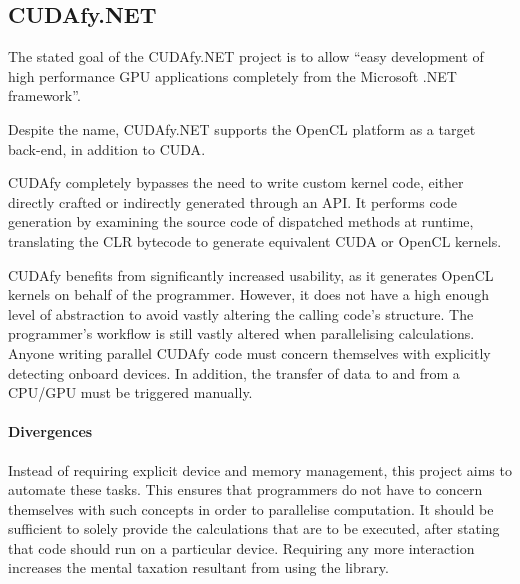 \subsection{CUDAfy.NET}
The stated goal of the CUDAfy.NET\cite{cudafy} project is to allow ``easy development of high performance \ac{GPU} applications completely from the Microsoft .NET framework''.

Despite the name, CUDAfy.NET supports the \ac{OpenCL} platform as a target back-end, in addition to \ac{CUDA}.

CUDAfy completely bypasses the need to write custom kernel code, either directly crafted or indirectly generated through an API. It performs code generation by examining the source code of dispatched methods at runtime, translating the \ac{CLR} bytecode to generate equivalent \ac{CUDA} or \ac{OpenCL} kernels.

CUDAfy benefits from significantly increased usability, as it generates \ac{OpenCL} kernels on behalf of the programmer. However, it does not have a high enough level of abstraction to avoid vastly altering the calling code's structure. The programmer's workflow is still vastly altered when parallelising calculations. Anyone writing parallel CUDAfy code must concern themselves with explicitly detecting onboard devices. In addition, the transfer of data to and from a \ac{CPU}/\ac{GPU} must be triggered manually.

\paragraph*{Divergences}
Instead of requiring explicit device and memory management, this project aims to automate these tasks. This ensures that programmers do not have to concern themselves with such concepts in order to parallelise computation. It should be sufficient to solely provide the calculations that are to be executed, after stating that code should run on a particular device. Requiring any more interaction increases the mental taxation resultant from using the library.
